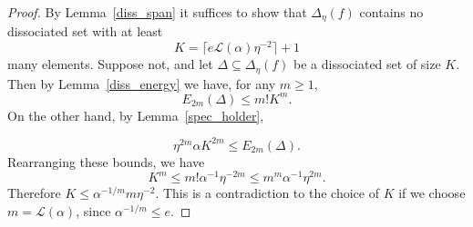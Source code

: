 \begin{proof}
By Lemma~\ref{diss_span} it suffices to show that $\Delta_\eta(f)$ contains no dissociated set with at least
\[K= \lceil e\mathcal{L}(\alpha)\eta^{-2}\rceil+1\]
many elements. Suppose not, and let $\Delta\subseteq \Delta_\eta(f)$ be a dissociated set of size $K$. Then by Lemma~\ref{diss_energy} we have, for any $m\geq 1$,
\[E_{2m}(\Delta)\leq m!K^m.\]
On the other hand, by Lemma~\ref{spec_holder},

\[\eta^{2m}\alpha K^{2m}\leq E_{2m}(\Delta).\]
Rearranging these bounds, we have
\[K^m \leq m! \alpha^{-1}\eta^{-2m}\leq m^m\alpha^{-1}\eta^{2m}.\]
Therefore $K\leq \alpha^{-1/m}m\eta^{-2}$. This is a contradiction to the choice of $K$ if we choose $m=\mathcal{L}(\alpha)$, since $\alpha^{-1/m}\leq e$.
\end{proof}
